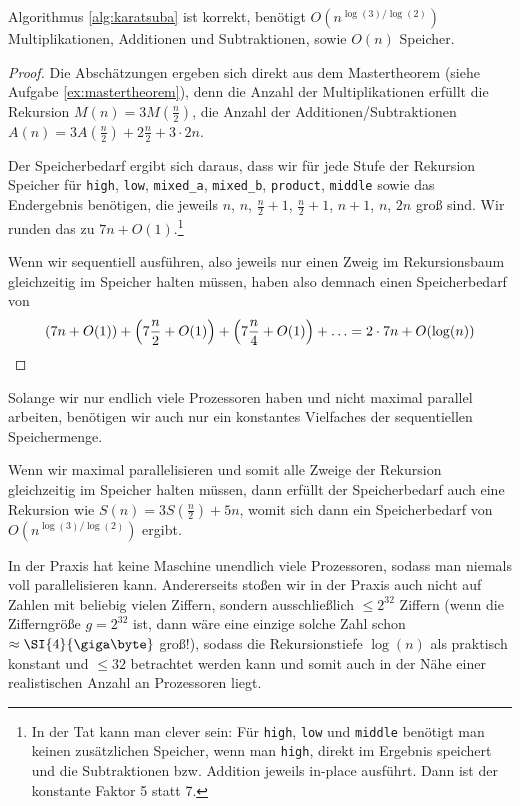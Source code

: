 \begin{proposition}
Algorithmus \ref{alg:karatsuba} ist korrekt, benötigt $O(n^{\log(3) / \log(2)})$ Multiplikationen, Additionen und Subtraktionen, sowie $O(n)$ Speicher.
\end{proposition}
\begin{proof}
Die Abschätzungen ergeben sich direkt aus dem Mastertheorem (siehe Aufgabe \ref{ex:mastertheorem}), denn die Anzahl der Multiplikationen erfüllt die Rekursion $M(n) = 3 M(\frac{n}{2})$, die Anzahl der Additionen/Subtraktionen $A(n) = 3 A(\frac{n}{2})+2\frac{n}{2} + 3\cdot 2n$.

\medskip
Der Speicherbedarf ergibt sich daraus, dass wir für jede Stufe der Rekursion Speicher für \texttt{high}, \texttt{low}, \texttt{mixed\_a}, \texttt{mixed\_b}, \texttt{product},  \texttt{middle} sowie das Endergebnis benötigen, die jeweils $n$, $n$, $\frac{n}{2}+1$, $\frac{n}{2}+1$, $n+1$, $n$, $2n$ groß sind. Wir runden das zu $7n+O(1)$.\footnote{In der Tat kann man clever sein: Für \texttt{high}, \texttt{low} und \texttt{middle} benötigt man keinen zusätzlichen Speicher, wenn man \texttt{high},  direkt im Ergebnis speichert und die Subtraktionen bzw. Addition jeweils in-place ausführt. Dann ist der konstante Faktor 5 statt 7.}

\smallskip
Wenn wir sequentiell ausführen, also jeweils nur einen Zweig im Rekursionsbaum gleichzeitig im Speicher halten müssen, haben also demnach einen Speicherbedarf von 
\[\left(7n + O(1)\right) + \left(7\frac{n}{2} + O(1)\right) + \left(7 \frac{n}{4} + O(1)\right) + \ldots = 2\cdot 7n+O(\log(n)) \qedhere\]
\end{proof}

\begin{remark}
Solange wir nur endlich viele Prozessoren haben und nicht maximal parallel arbeiten, benötigen wir auch nur ein konstantes Vielfaches der sequentiellen Speichermenge.

Wenn wir maximal parallelisieren und somit alle Zweige der Rekursion gleichzeitig im Speicher halten müssen, dann erfüllt der Speicherbedarf auch eine Rekursion wie $S(n) = 3S(\frac{n}{2})+5n$, womit sich dann ein Speicherbedarf von $O(n^{\log(3)/\log(2)})$ ergibt.

In der Praxis hat keine Maschine unendlich viele Prozessoren, sodass man niemals voll parallelisieren kann. Andererseits stoßen wir in der Praxis auch nicht auf Zahlen mit beliebig vielen Ziffern, sondern ausschließlich $\leq 2^{32}$ Ziffern (wenn die Zifferngröße $g=2^{32}$ ist, dann wäre eine einzige solche Zahl schon $\approx \SI{4}{\giga\byte}$ groß!), sodass die Rekursionstiefe $\log(n)$ als praktisch konstant und $\leq 32$ betrachtet werden kann und somit auch in der Nähe einer realistischen Anzahl an Prozessoren liegt.
\end{remark}